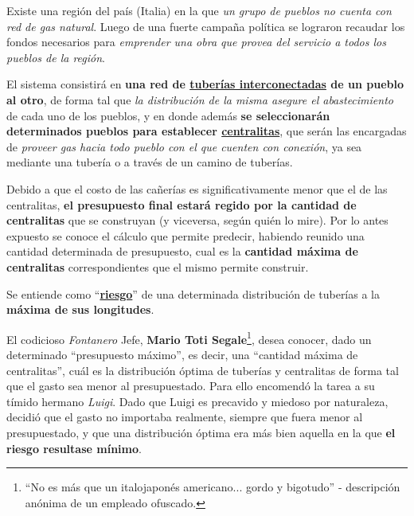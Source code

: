\documentclass[11pt, a4paper, twoside]{article}
\begin{document}
{}

\begin{paragraph}{}


Existe una región del país (Italia) en la que \emph{un grupo de pueblos no cuenta con red de gas natural}.
Luego de una fuerte campaña política se lograron recaudar los fondos necesarios para \emph{emprender
una obra que provea del servicio a todos los pueblos de la región}.

El sistema consistirá en \textbf{una red de \underline{tuberías interconectadas} de un pueblo al
otro}, de forma tal que \emph{la distribución de la misma asegure el abastecimiento} de cada uno de
los pueblos, y en donde además \textbf{se seleccionarán determinados pueblos para establecer
\underline{centralitas}}, que serán las encargadas de \emph{proveer gas hacia todo pueblo con el que
cuenten con conexión}, ya sea mediante una tubería o a través de un camino de tuberías.

Debido a que el costo de las cañerías es significativamente menor que el de las centralitas,
\textbf{el presupuesto final estará regido por la cantidad de centralitas} que se construyan (y
viceversa, según quién lo mire). Por lo antes expuesto se conoce el cálculo que permite predecir,
habiendo reunido una cantidad determinada de presupuesto, cual es la \textbf{cantidad máxima de
centralitas} correspondientes que el mismo permite construir.

Se entiende como ``\underline{\textbf{riesgo}}'' de una determinada distribución de tuberías a la
\textbf{máxima de sus longitudes}.

El codicioso \emph{Fontanero} Jefe, \textbf{Mario Toti Segale}\footnote{``No es más que un italojaponés americano...
gordo y bigotudo'' - descripción anónima de un empleado ofuscado.}, desea conocer, dado un determinado
``presupuesto máximo'', es decir, una ``cantidad máxima de centralitas'', cuál es la distribución
óptima de tuberías y centralitas de forma tal que el gasto sea menor al presupuestado. Para ello
encomendó la tarea a su tímido hermano \emph{Luigi}. Dado que Luigi es precavido y miedoso por naturaleza,
decidió que el gasto no importaba realmente, siempre que fuera menor al presupuestado, y que una
distribución óptima era más bien aquella en la que \textbf{el riesgo resultase mínimo}.

\end{paragraph}
\end{document}
